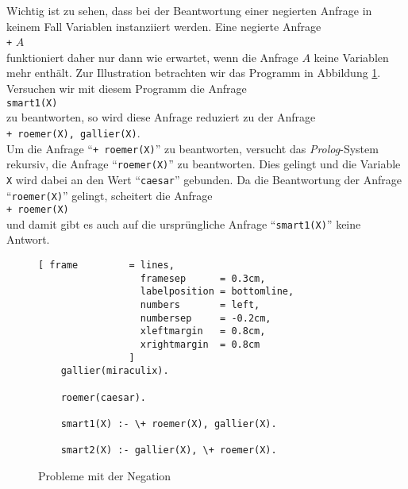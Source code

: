 Wichtig ist zu sehen, dass bei der Beantwortung einer negierten Anfrage in keinem Fall
Variablen instanziiert werden.  Eine negierte Anfrage
\\[0.1cm]
\hspace*{1.3cm} \texttt{+} $A$ \\[0.1cm]
funktioniert daher nur dann wie erwartet, wenn die Anfrage $A$ keine Variablen mehr
enthält.  Zur Illustration betrachten wir das Programm in Abbildung \ref{fig:not-problem}.
Versuchen wir mit diesem Programm die Anfrage \\[0.1cm]
\hspace*{1.3cm} \texttt{smart1(X)} \\[0.1cm]
zu beantworten, so wird diese Anfrage reduziert zu der Anfrage \\[0.1cm]
\hspace*{1.3cm} \texttt{+ roemer(X), gallier(X)}. \\[0.1cm]
Um die Anfrage ``\texttt{+ roemer(X)}'' zu beantworten, 
versucht das \textsl{Prolog}-System rekursiv, die Anfrage ``\texttt{roemer(X)}''
zu beantworten.  Dies gelingt und die Variable \texttt{X} wird dabei an den Wert 
``\texttt{caesar}'' gebunden.  Da die Beantwortung der Anfrage ``\texttt{roemer(X)}''
gelingt, scheitert die Anfrage \\[0.1cm]
\hspace*{1.3cm} \texttt{+ roemer(X)} \\[0.1cm]
und damit gibt es auch auf die ursprüngliche Anfrage ``\texttt{smart1(X)}'' keine Antwort.

\begin{figure}[!ht]
  \centering
\begin{Verbatim}[ frame         = lines, 
                  framesep      = 0.3cm, 
                  labelposition = bottomline,
                  numbers       = left,
                  numbersep     = -0.2cm,
                  xleftmargin   = 0.8cm,
                  xrightmargin  = 0.8cm
                ]
    gallier(miraculix).
    
    roemer(caesar).
    
    smart1(X) :- \+ roemer(X), gallier(X).
    
    smart2(X) :- gallier(X), \+ roemer(X).
\end{Verbatim}
\vspace*{-0.3cm}
  \caption{Probleme mit der Negation}
  \label{fig:not-problem}
\end{figure}

